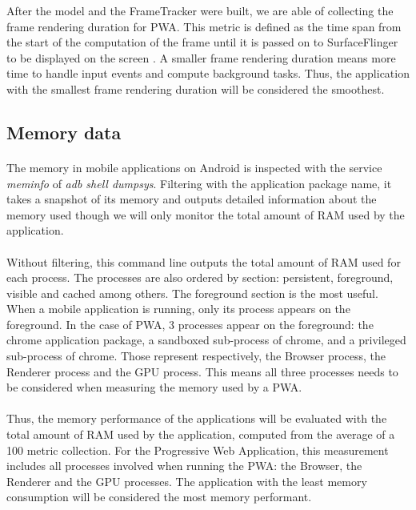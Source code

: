 \documentclass{kththesis}
\begin{document}
After the model and the FrameTracker were built, we are able of collecting the frame rendering duration for PWA. This metric is defined as the time span from the start of the computation of the frame until it is passed on to SurfaceFlinger to be displayed on the screen . A smaller frame rendering duration means more time to handle input events and compute background tasks. Thus, the application with the smallest frame rendering duration will be considered the smoothest.
\fi

\subsection{Memory data}

\paragraph{}
The memory in mobile applications on Android is inspected with the service \textit{meminfo} of \textit{adb shell dumpsys}. Filtering with the application package name, it takes a snapshot of its memory and outputs detailed information about the memory used though we will only monitor the total amount of RAM used by the application.

\paragraph{}
Without filtering, this command line outputs the total amount of RAM used for each process. The processes are also ordered by section: persistent, foreground, visible and cached among others. \newline
The foreground section is the most useful. When a mobile application is running, only its process appears on the foreground. In the case of PWA, 3 processes appear on the foreground: the chrome application package, a sandboxed sub-process of chrome, and a privileged sub-process of chrome. Those represent respectively, the Browser process, the Renderer process and the GPU process. This means all three processes needs to be considered when measuring the memory used by a PWA. 

\paragraph{}
Thus, the memory performance of the applications will be evaluated with the total amount of RAM used by the application, computed from the average of a 100 metric collection. For the Progressive Web Application, this measurement includes all processes involved when running the PWA: the Browser, the Renderer and the GPU processes. The application with the least memory consumption will be considered the most memory performant.
\end{document}

